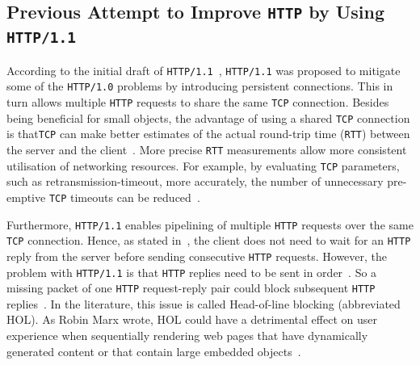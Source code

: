 \documentclass[12pt,a4paper,twoside,openright]{report}
\begin{document}
\subsection{Previous Attempt to Improve \texttt{HTTP} by Using \texttt{HTTP/1.1}}

According to the initial draft of \texttt{HTTP/1.1}~\cite{RFC2068}, \texttt{HTTP/1.1} was proposed to mitigate some of the \texttt{HTTP/1.0} problems by introducing persistent connections.
This in turn allows multiple \texttt{HTTP} requests to share the same \texttt{TCP} connection.
Besides being beneficial for small objects, the advantage of using a shared \texttt{TCP} connection is that\texttt{TCP} can make better estimates of the actual round-trip time (\texttt{RTT}) between the server and the client~\cite{bib_Computer_Networking_L6}.
More precise \texttt{RTT} measurements allow more consistent utilisation of networking resources.
For example, by evaluating \texttt{TCP} parameters, such as retransmission-timeout, more accurately, the number of unnecessary pre-emptive \texttt{TCP} timeouts can be reduced~\cite{bib_rtt_tcp_Retransmissions}.

Furthermore, \texttt{HTTP/1.1} enables pipelining of multiple \texttt{HTTP} requests over the same \texttt{TCP} connection.
Hence, as stated in~\cite{bib_digital_ocean_http11_vs_http2}, the client does not need to wait for an \texttt{HTTP} reply from the server before sending consecutive \texttt{HTTP} requests.
However, the problem with \texttt{HTTP/1.1} is that \texttt{HTTP} replies need to be sent in order~\cite{RFC7540}. 
So a missing packet of one \texttt{HTTP} request-reply pair could block subsequent \texttt{HTTP} replies~\cite{bib_digital_ocean_http11_vs_http2, head-of-line-blocking-in-quic-and-http-3-the-details}.
In the literature, this issue is called Head-of-line blocking (abbreviated HOL).
As Robin Marx wrote, HOL could have a detrimental effect on user experience when sequentially rendering web pages that have dynamically generated content or that contain large embedded objects~\cite{head-of-line-blocking-in-quic-and-http-3-the-details}.
\end{document}
